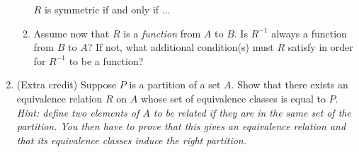 \documentclass{amsart}
\theoremstyle{definition}
\begin{document}
\begin{enumerate}
\begin{enumerate}
    $R$ is symmetric if and only if ...
  \item Assume now that $R$ is a \emph{function} from $A$ to $B$. Is $R^{-1}$ always a function from $B$ to $A$? If not, what additional condition(s) must $R$ satisfy in order for $R^{-1}$ to be a function?
  \end{enumerate}
\item (Extra credit) Suppose $P$ is a partition of a set $A$. Show that there exists an equivalence relation $R$ on $A$ whose set of equivalence classes is equal to $P$. \emph{Hint: define two elements of $A$ to be related if they are in the same set of the partition. You then have to prove that this gives an equivalence relation and that its equivalence classes induce the right partition.}


\end{enumerate}



\end{document}
